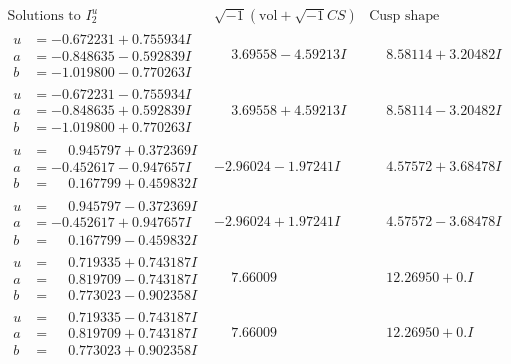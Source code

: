 \documentclass[1p]{elsarticle_modified}
\theoremstyle{definition}
\newcommand{\I}{\sqrt{-1}}
\begin{document}
$$\begin{array}{c|c|c}  
\text{Solutions to }I^u_{2}& \I (\text{vol} + \sqrt{-1}CS) & \text{Cusp shape}\\
 \hline 
\begin{aligned}
u &= -0.672231 + 0.755934 I \\
a &= -0.848635 - 0.592839 I \\
b &= -1.019800 - 0.770263 I\end{aligned}
 & \phantom{-}3.69558 - 4.59213 I & \phantom{-}8.58114 + 3.20482 I \\ \hline\begin{aligned}
u &= -0.672231 - 0.755934 I \\
a &= -0.848635 + 0.592839 I \\
b &= -1.019800 + 0.770263 I\end{aligned}
 & \phantom{-}3.69558 + 4.59213 I & \phantom{-}8.58114 - 3.20482 I \\ \hline\begin{aligned}
u &= \phantom{-}0.945797 + 0.372369 I \\
a &= -0.452617 - 0.947657 I \\
b &= \phantom{-}0.167799 + 0.459832 I\end{aligned}
 & -2.96024 - 1.97241 I & \phantom{-}4.57572 + 3.68478 I \\ \hline\begin{aligned}
u &= \phantom{-}0.945797 - 0.372369 I \\
a &= -0.452617 + 0.947657 I \\
b &= \phantom{-}0.167799 - 0.459832 I\end{aligned}
 & -2.96024 + 1.97241 I & \phantom{-}4.57572 - 3.68478 I \\ \hline\begin{aligned}
u &= \phantom{-}0.719335 + 0.743187 I \\
a &= \phantom{-}0.819709 - 0.743187 I \\
b &= \phantom{-}0.773023 - 0.902358 I\end{aligned}
 & \phantom{-}7.66009\phantom{ +0.000000I} & \phantom{-}12.26950 + 0. I\phantom{ +0.000000I} \\ \hline\begin{aligned}
u &= \phantom{-}0.719335 - 0.743187 I \\
a &= \phantom{-}0.819709 + 0.743187 I \\
b &= \phantom{-}0.773023 + 0.902358 I\end{aligned}
 & \phantom{-}7.66009\phantom{ +0.000000I} & \phantom{-}12.26950 + 0. I\phantom{ +0.000000I} \\ \hline\begin{aligned}

\end{aligned}
\end{array}$$
\end{document}

